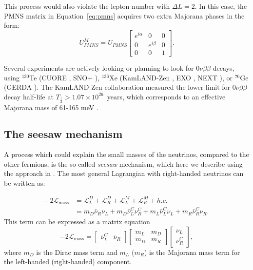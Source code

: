This process would also violate the lepton number with $\Delta L = 2$. In this case, the PMNS matrix in Equation~\ref{eq:pmns} acquires two extra Majorana phases in the form:
\begin{equation}
    U_{PMNS}^M = U_{PMNS} \begin{bmatrix}
    e^{i\alpha} & 0 & 0 \\
    0 & e^{i\beta} & 0 \\
    0 & 0 & 1
    \end{bmatrix}.
\end{equation}

Several experiments are actively looking or planning to look for $0\nu\beta\beta$ decays, using $^{130}$Te (CUORE \cite{Arnaboldi:2002du}, SNO+ \cite{Andringa:2015tza}), $^{136}$Xe (KamLAND-Zen \cite{KamLAND-Zen:2016pfg}, EXO \cite{Auger:2012ar}, NEXT \cite{Alvarez:2012flf}), or $^{76}$Ge (GERDA \cite{Agostini:2013mzu}). 
The KamLAND-Zen collaboration measured the lower limit for $0\nu\beta\beta$ decay half-life at $T_{\frac{1}{2}} > 1.07\times10^{26}$~years, which corresponds to an effective Majorana mass of 61-165 meV \cite{KamLAND-Zen:2016pfg}.

\subsection{The seesaw mechanism}\label{sec:seesaw}
A process which could explain the small masses of the neutrinos, compared to the other fermions, is the so-called \emph{seesaw} mechanism, which here we describe using the approach in \cite{Grossman:2003eb}. 
The most general Lagrangian with right-handed neutrinos can be written as:

\begin{align}
    -2\mathcal{L}_{\mathrm{mass}} & = \mathcal{L}^D_L + \mathcal{L}^D_R + \mathcal{L}^M_L + \mathcal{L}^M_R + h.c. \\
    & = m_D \bar{\nu}_R \nu_L + m_D \bar{\nu}^C_L\nu^C_R + m_L\bar{\nu}_L^C\nu_L + m_R \bar{\nu}_R^C\nu_R.
\end{align}
This term can be expressed as a matrix equation 
\begin{equation}
    -2\mathcal{L_\mathrm{mass}} = \begin{bmatrix}
    \bar{\nu}_L^C & \bar{\nu}_R
    \end{bmatrix}\begin{bmatrix}
    m_L & m_D \\
    m_D & m_R
    \end{bmatrix}\begin{bmatrix}
    \nu_L \\ \nu_R^C
    \end{bmatrix},
\end{equation}
where $m_D$ is the Dirac mass term and $m_L$ ($m_R$) is the Majorana mass term for the left-handed (right-handed) component. 

